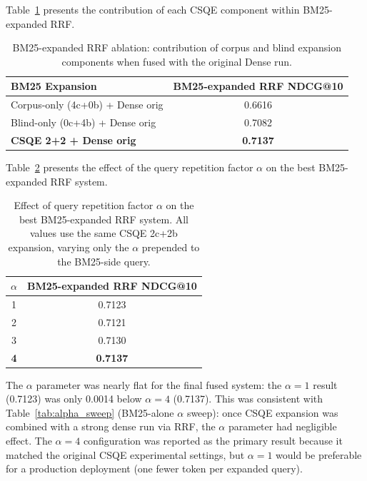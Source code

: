 Table~\ref{tab:config_a_ablation} presents the contribution of each CSQE component within BM25-expanded RRF.

\begin{table}[htbp]
    \centering
    \caption[BM25-expanded RRF component ablation]{BM25-expanded RRF ablation: contribution of corpus and blind expansion components when fused with the original Dense run.}
    \label{tab:config_a_ablation}
    \begin{tabular}{@{}lc@{}}
        \toprule
        \textbf{BM25 Expansion} & \textbf{BM25-expanded RRF NDCG@10} \\
        \midrule
        Corpus-only (4c+0b) + Dense orig & 0.6616 \\
        Blind-only (0c+4b) + Dense orig & 0.7082 \\
        \textbf{CSQE 2+2 + Dense orig} & \textbf{0.7137} \\
        \bottomrule
    \end{tabular}
\end{table}

Table~\ref{tab:config_a_alpha} presents the effect of the query repetition factor $\alpha$ on the best BM25-expanded RRF system.

\begin{table}[htbp]
    \centering
    \caption[Effect of $\alpha$ on the best BM25-expanded RRF system]{Effect of query repetition factor $\alpha$ on the best BM25-expanded RRF system. All values use the same CSQE 2c+2b expansion, varying only the $\alpha$ prepended to the BM25-side query.}
    \label{tab:config_a_alpha}
    \begin{tabular}{@{}cc@{}}
        \toprule
        $\alpha$ & \textbf{BM25-expanded RRF NDCG@10} \\
        \midrule
        1 & 0.7123 \\
        2 & 0.7121 \\
        3 & 0.7130 \\
        \textbf{4} & \textbf{0.7137} \\
        \bottomrule
    \end{tabular}
\end{table}

The $\alpha$ parameter was nearly flat for the final fused system: the $\alpha=1$ result (0.7123) was only 0.0014 below $\alpha=4$ (0.7137). This was consistent with Table~\ref{tab:alpha_sweep} (BM25-alone $\alpha$ sweep): once CSQE expansion was combined with a strong dense run via RRF, the $\alpha$ parameter had negligible effect. The $\alpha=4$ configuration was reported as the primary result because it matched the original CSQE experimental settings, but $\alpha=1$ would be preferable for a production deployment (one fewer token per expanded query).

